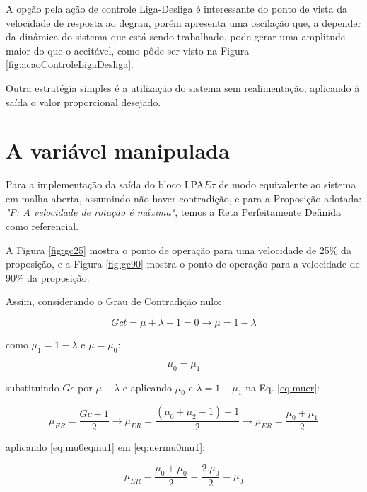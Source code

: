 

A opção pela ação de controle Liga-Desliga
é interessante do ponto de vista da velocidade 
de resposta ao degrau, 
porém apresenta uma oscilação que, 
a depender da dinâmica do sistema que está sendo trabalhado,
pode gerar uma amplitude maior do que o aceitável,
como pôde ser visto na 
Figura \ref{fig:acaoControleLigaDesliga}.

Outra estratégia simples é a 
utilização do sistema sem realimentação, 
aplicando à saída o valor proporcional desejado.


\section{A variável manipulada}

Para a implementação da saída do bloco 
LPA$E\tau$ de modo equivalente ao sistema em malha aberta,
assumindo não haver contradição, 
e para a Proposição adotada: 
\emph{"P: A velocidade de rotação é máxima"}, 
temos a Reta Perfeitamente Definida como referencial. 

A Figura \ref{fig:gc25} mostra o ponto de operação 
para uma velocidade de 25\% da proposição, 
e a Figura \ref{fig:gc90} mostra o ponto de operação
para a velocidade de 90\% da proposição.

Assim, considerando o Grau de Contradição nulo:

\begin{equation}
Gct = \mu + \lambda - 1 = 0 \rightarrow \mu = 1 - \lambda
\end{equation}

como $\mu_1 = 1 - \lambda$ e $\mu = \mu_0$:

\begin{equation}
\mu_0 = \mu_1
\label{eq:mu0eqmu1}
\end{equation}

substituindo $Gc$ por $\mu-\lambda$ e aplicando $\mu_0$ e $\lambda = 1 - \mu_1$ na Eq. \ref{eq:muer}:

\begin{equation}
\mu_{ER} = \frac{Gc + 1}{2} \rightarrow \mu_{ER} = \frac{(\mu_0 + \mu_2 - 1) + 1}{2} \rightarrow \mu_{ER} = \frac{\mu_0 + \mu_1}{2}
\label{eq:uermu0mu1}
\end{equation}

aplicando \ref{eq:mu0eqmu1} em \ref{eq:uermu0mu1}:

\begin{equation}
\mu_{ER} = \frac{\mu_0 + \mu_0}{2} = \frac{2.\mu_0}{2} = \mu_0
\end{equation}


